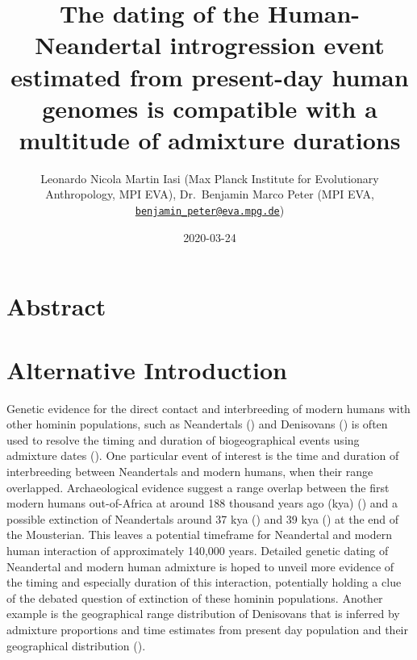 \documentclass[]{article}
\title{The dating of the Human-Neandertal introgression event estimated from present-day human genomes is compatible with a multitude of admixture durations}
\author{Leonardo Nicola Martin Iasi (Max Planck Institute for Evolutionary
Anthropology, MPI EVA), Dr.~Benjamin Marco Peter (MPI EVA,
\href{mailto:benjamin_peter@eva.mpg.de}{\nolinkurl{benjamin\_peter@eva.mpg.de}})}
\date{2020-03-24}
\begin{document}
\maketitle

\section{Abstract}\label{abstract}

\section{Alternative Introduction}\label{alternative introduction}


Genetic evidence for the direct contact and interbreeding of modern humans with other hominin populations, such as Neandertals (\cite{green_draft_2010,prufer_complete_2013,vernot_resurrecting_2014,fu_early_2015,fu_genome_2014,sankararaman_genomic_2014,prufer_high-coverage_2017}) and Denisovans (\cite{reich_genetic_2010,meyer_high-coverage_2012,sankararaman_combined_2016,vernot_excavating_2016,malaspinas_genomic_2016}) is often used to resolve the timing and duration of biogeographical events using admixture dates (\cite{sankararaman_date_2012,jacobs_multiple_2019,vyas_analyses_2019}). One particular event of interest is the time and duration of interbreeding between Neandertals and modern humans, when their range overlapped. Archaeological evidence suggest a range overlap between the first modern humans out-of-Africa at around 188 thousand years ago (kya) (\cite{stringer_when_2018,hershkovitz_earliest_2018}) and a possible extinction of Neandertals around 37 kya (\cite{zilhao_precise_2017}) and 39 kya (\cite{higham_timing_2014}) at the end of the Mousterian. This leaves a potential timeframe for Neandertal and modern human interaction of approximately 140,000 years. Detailed genetic dating of Neandertal and modern human admixture is hoped to unveil more evidence of the timing and especially duration of this interaction,
potentially holding a clue of the debated question of extinction of these hominin populations. Another example is the geographical range distribution of Denisovans that is inferred by admixture proportions and time estimates from present day population and their geographical distribution (\cite{jacobs_multiple_2019}). 
\end{document}
